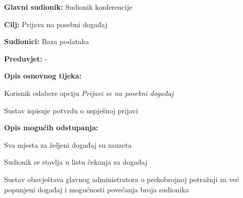			
						\noindent {}
					\begin{packed_item}
						
						\item \textbf{Glavni sudionik:} Sudionik konferencije
						\item  \textbf{Cilj:} Prijava na posebni događaj
						\item  \textbf{Sudionici:} Baza podataka
						\item  \textbf{Preduvjet:} -
						\item  \textbf{Opis osnovnog tijeka:}
						
						\item[] \begin{packed_enum}
							
							\item Korisnik odabere opciju \textit{Prijavi se na posebni događaj}
							\item Sustav ispisuje potvrdu o uspješnoj prijavi
						\end{packed_enum}
						\item  \textbf{Opis mogućih odstupanja:}
					
					\item[] \begin{packed_item}
						
						\item[1.] Sva mjesta za željeni događaj su zauzeta
						\item[] \begin{packed_enum}

                                \item Sudionik se stavlja u listu čekanja za događaj
							\item Sustav obavještava glavnog administratora o prekobrojnoj potražnji za već popunjeni događaj i mogućnosti povećanja broja sudionika
							
						\end{packed_enum}
						
					\end{packed_item}
				\end{packed_item}
			

